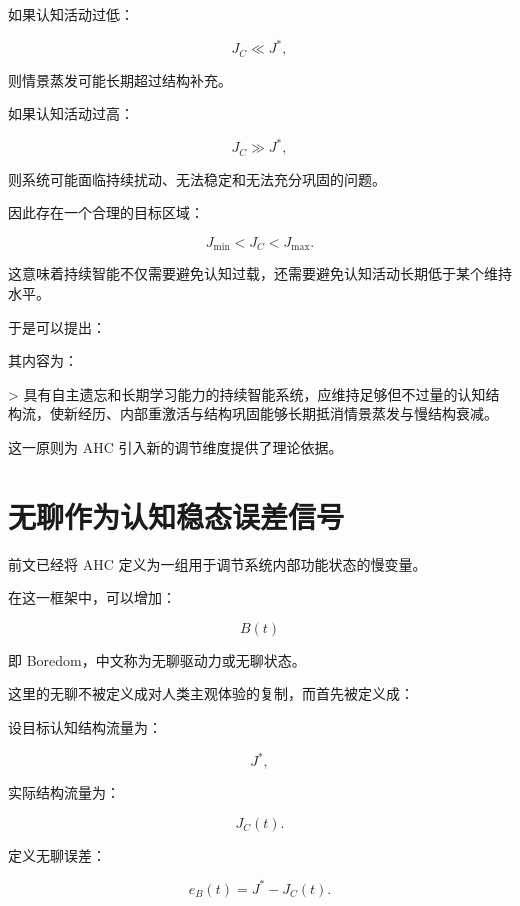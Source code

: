 如果认知活动过低：

\[
J_C\ll J^*,
\]

则情景蒸发可能长期超过结构补充。

如果认知活动过高：

\[
J_C\gg J^*,
\]

则系统可能面临持续扰动、无法稳定和无法充分巩固的问题。

因此存在一个合理的目标区域：

\[
\boxed{
J_{\min}
<
J_C
<
J_{\max}.
}
\]

这意味着持续智能不仅需要避免认知过载，还需要避免认知活动长期低于某个维持水平。

于是可以提出：

\begin{statementbox}
\centering
{}
\end{statementbox}

其内容为：

> 具有自主遗忘和长期学习能力的持续智能系统，应维持足够但不过量的认知结构流，使新经历、内部重激活与结构巩固能够长期抵消情景蒸发与慢结构衰减。

这一原则为 AHC 引入新的调节维度提供了理论依据。

\section{无聊作为认知稳态误差信号}

前文已经将 AHC 定义为一组用于调节系统内部功能状态的慢变量。

在这一框架中，可以增加：

\[
\boxed{
B(t)
}
\]

即 Boredom，中文称为无聊驱动力或无聊状态。

这里的无聊不被定义成对人类主观体验的复制，而首先被定义成：

\begin{statementbox}
\centering
{}
\end{statementbox}

设目标认知结构流量为：

\[
J^*,
\]

实际结构流量为：

\[
J_C(t).
\]

定义无聊误差：

\[
\boxed{
e_B(t)
=
J^*-J_C(t).
}
\]

